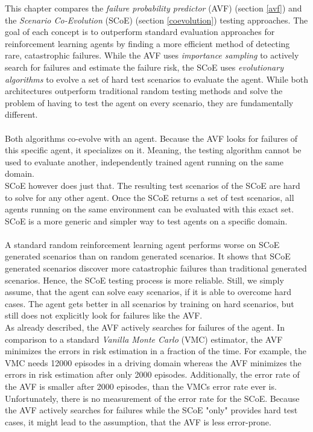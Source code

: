 This chapter compares the \textit{failure probability predictor} (AVF) (section \ref{avf}) and the \textit{Scenario Co-Evolution} (SCoE) (section \ref{coevolution}) testing approaches. The goal of each concept is to outperform standard evaluation approaches for reinforcement learning agents by finding a more efficient method of detecting rare, catastrophic failures. While the AVF uses \textit{importance sampling} to actively search for failures and estimate the failure risk, the SCoE uses \textit{evolutionary algorithms} to evolve a set of hard test scenarios to evaluate the agent. While both architectures outperform traditional random testing methods and solve the problem of having to test the agent on every scenario, they are fundamentally different.\\\\
Both algorithms co-evolve with an agent. Because the AVF looks for failures of this specific agent, it specializes on it. Meaning, the testing algorithm cannot be used to evaluate another, independently trained agent running on the same domain.\\
SCoE however does just that. The resulting test scenarios of the SCoE are hard to solve for any other agent. Once the SCoE returns a set of test scenarios, all agents running on the same environment can be evaluated with this exact set. SCoE is a more generic and simpler way to test agents on a specific domain.\\\\
A standard random reinforcement learning agent performs worse on SCoE generated scenarios than on random generated scenarios. It shows that SCoE generated scenarios discover more catastrophic failures than traditional generated scenarios. Hence, the SCoE testing process is more reliable. Still, we simply assume, that the agent can solve easy scenarios, if it is able to overcome hard cases. The agent gets better in all scenarios by training on hard scenarios, but still does not explicitly look for failures like the AVF.\\
As already described, the AVF actively searches for failures of the agent. In comparison to a standard \textit{Vanilla Monte Carlo} (VMC) estimator, the AVF minimizes the errors in risk estimation in a fraction of the time. For example, the VMC needs 12000 episodes in a driving domain whereas the AVF minimizes the errors in risk estimation after only 2000 episodes. Additionally, the error rate of the AVF is smaller after 2000 episodes, than the VMCs error rate ever is. Unfortunately, there is no measurement of the error rate for the SCoE. Because the AVF actively searches for failures while the SCoE "only" provides hard test cases, it might lead to the assumption, that the AVF is less error-prone.\\\\
